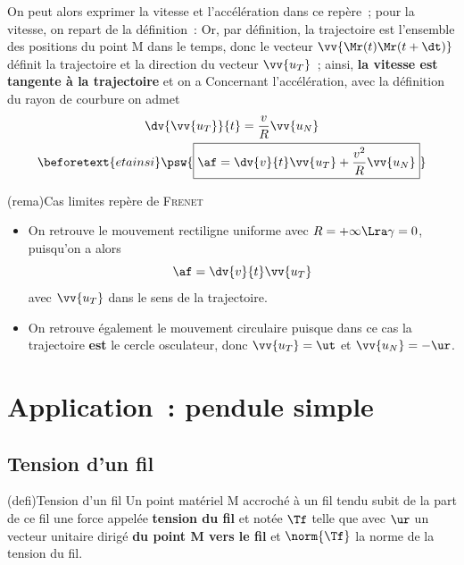 \documentclass[../../main/main.tex]{subfiles}
\begin{document}
On peut alors exprimer la vitesse et l'accélération dans ce repère~; pour la
vitesse, on repart de la définition~:
Or, par définition, la trajectoire est l'ensemble des positions du point M dans
le temps, donc le vecteur $\vv{\Mr(t)\Mr(t+\dt)}$ définit la trajectoire et la
direction du vecteur $\vv{u_T}$~; ainsi, \textbf{la vitesse est tangente à la
	trajectoire} et on a
  \psw{
    \[
    \boxed{\vf = v\vv{u_T}}
  \]
  }
Concernant l'accélération, avec la définition du rayon de courbure on admet
\begin{gather*}
  \dv{\vv{u_T}}{t} = \frac{v}{R}\vv{u_N}
  \\
  \beforetext{et ainsi}
	\psw{
	  \boxed{\af = \dv{v}{t}\vv{u_T} + \frac{v^2}{R}\vv{u_N}}
	}
\end{gather*}

\begin{tcb*}(rema){Cas limites repère de \textsc{Frenet}}
  \begin{itemize}
  \item On retrouve le mouvement rectiligne uniforme avec $R = +\infty \Lra
          \gamma = 0$, puisqu'on a alors
        \[\af = \dv{v}{t}\vv{u_T}\]
        avec $\vv{u_T}$ dans le sens de la trajectoire.

  \item On retrouve également le mouvement circulaire puisque dans ce cas la
        trajectoire \textbf{est} le cercle osculateur, donc $\vv{u_T} = \ut$ et
        $\vv{u_N} = -\ur$.
\end{itemize}
\end{tcb*}


\section{Application~: pendule simple}

\subsection{Tension d'un fil}
\begin{tcb*}(defi){Tension d'un fil}
	Un point matériel M accroché à un fil tendu subit de la part de ce fil une
	force appelée \textbf{tension du fil} et notée $\Tf$ telle que
  \psw{
      \[\boxed{\Tf = \norm{\Tf}\ur}\]
  }
  avec $\ur$ un vecteur unitaire dirigé \textbf{du point M vers le fil} et
  $\norm{\Tf}$ la norme de la tension du fil.
\end{tcb*}
\end{document}
